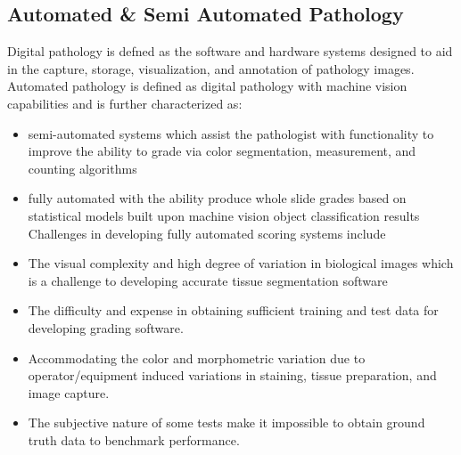 \subsection{ Automated \& Semi Automated Pathology}
Digital pathology is defned as the software and hardware systems designed to aid in the capture, storage, visualization, and annotation of pathology images. Automated pathology is defined as digital pathology with machine vision capabilities and is further characterized as:
\begin{itemize}
  \item semi-automated systems which assist the pathologist with functionality to improve the ability to grade via color segmentation, measurement, and counting algorithms
  \item fully automated with the ability produce whole slide grades based on statistical models built upon machine vision object classification results Challenges in developing fully automated scoring systems include
  \item The visual complexity and high degree of variation in biological images which is a challenge to developing accurate tissue segmentation software
      \item The difficulty and expense in obtaining sufficient training and test data for developing grading software.
  \item Accommodating the color and morphometric variation due to operator/equipment induced variations in staining, tissue preparation, and image capture.
  \item The subjective nature of some tests make it impossible to obtain ground truth data to benchmark performance.
\end{itemize}


